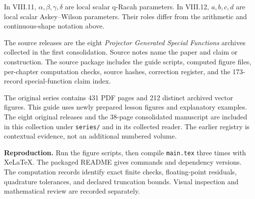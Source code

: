 \documentclass[11pt]{article}
\begin{document}
\vspace{0.1in}
In VIII.11, $\alpha,\beta,\gamma,\delta$ are local scalar q-Racah parameters. In VIII.12, $a,b,c,d$ are local scalar Askey--Wilson parameters. Their roles differ from the arithmetic and continuous-shape notation above.

\vspace{0.1in}
The source releases are the eight \emph{Projector Generated Special Functions} archives collected in the first consolidation. Source notes name the paper and claim or construction. The source package includes the guide scripts, computed figure files, per-chapter computation checks, source hashes, correction register, and the 173-record special-function claim index.

The original series contains 431 PDF pages and 212 distinct archived vector figures. This guide uses newly prepared lesson figures and explanatory examples. The eight original releases and the 38-page consolidated manuscript are included in this collection under \texttt{series/} and in its collected reader. The earlier registry is contextual evidence, not an additional numbered volume.

\textbf{Reproduction.} Run the figure scripts, then compile \texttt{main.tex} three times with XeLaTeX. The packaged README gives commands and dependency versions. The computation records identify exact finite checks, floating-point residuals, quadrature tolerances, and declared truncation bounds. Visual inspection and mathematical review are recorded separately.
\end{document}
